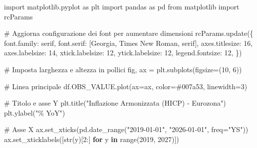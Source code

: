 \documentclass[
  11pt,
]{article}
\newenvironment{Shaded}{\begin{snugshade}}{\end{snugshade}}
\newcommand{\BuiltInTok}[1]{\textcolor[rgb]{0.00,0.23,0.31}{#1}}
\newcommand{\CommentTok}[1]{\textcolor[rgb]{0.37,0.37,0.37}{#1}}
\newcommand{\ControlFlowTok}[1]{\textcolor[rgb]{0.00,0.23,0.31}{\textbf{#1}}}
\newcommand{\DecValTok}[1]{\textcolor[rgb]{0.68,0.00,0.00}{#1}}
\newcommand{\ImportTok}[1]{\textcolor[rgb]{0.00,0.46,0.62}{#1}}
\newcommand{\KeywordTok}[1]{\textcolor[rgb]{0.00,0.23,0.31}{\textbf{#1}}}
\newcommand{\NormalTok}[1]{\textcolor[rgb]{0.00,0.23,0.31}{#1}}
\newcommand{\OperatorTok}[1]{\textcolor[rgb]{0.37,0.37,0.37}{#1}}
\newcommand{\StringTok}[1]{\textcolor[rgb]{0.13,0.47,0.30}{#1}}
\begin{document}
\begin{Shaded}
\begin{Highlighting}[]
\ImportTok{import}\NormalTok{ matplotlib.pyplot }\ImportTok{as}\NormalTok{ plt}
\ImportTok{import}\NormalTok{ pandas }\ImportTok{as}\NormalTok{ pd}
\ImportTok{from}\NormalTok{ matplotlib }\ImportTok{import}\NormalTok{ rcParams}

\CommentTok{\# Aggiorna configurazione dei font per aumentare dimensioni}
\NormalTok{rcParams.update(\{}
    \StringTok{\textquotesingle{}font.family\textquotesingle{}}\NormalTok{: }\StringTok{\textquotesingle{}serif\textquotesingle{}}\NormalTok{,}
    \StringTok{\textquotesingle{}font.serif\textquotesingle{}}\NormalTok{: [}\StringTok{\textquotesingle{}Georgia\textquotesingle{}}\NormalTok{, }\StringTok{\textquotesingle{}Times New Roman\textquotesingle{}}\NormalTok{, }\StringTok{\textquotesingle{}serif\textquotesingle{}}\NormalTok{],}
    \StringTok{\textquotesingle{}axes.titlesize\textquotesingle{}}\NormalTok{: }\DecValTok{16}\NormalTok{,}
    \StringTok{\textquotesingle{}axes.labelsize\textquotesingle{}}\NormalTok{: }\DecValTok{14}\NormalTok{,}
    \StringTok{\textquotesingle{}xtick.labelsize\textquotesingle{}}\NormalTok{: }\DecValTok{12}\NormalTok{,}
    \StringTok{\textquotesingle{}ytick.labelsize\textquotesingle{}}\NormalTok{: }\DecValTok{12}\NormalTok{,}
    \StringTok{\textquotesingle{}legend.fontsize\textquotesingle{}}\NormalTok{: }\DecValTok{12}\NormalTok{,}
\NormalTok{\})}

\CommentTok{\# Imposta larghezza e altezza in pollici}
\NormalTok{fig, ax }\OperatorTok{=}\NormalTok{ plt.subplots(figsize}\OperatorTok{=}\NormalTok{(}\DecValTok{10}\NormalTok{, }\DecValTok{6}\NormalTok{))}

\CommentTok{\# Linea principale}
\NormalTok{df.OBS\_VALUE.plot(ax}\OperatorTok{=}\NormalTok{ax, color}\OperatorTok{=}\StringTok{\textquotesingle{}\#007a53\textquotesingle{}}\NormalTok{, linewidth}\OperatorTok{=}\DecValTok{3}\NormalTok{)}

\CommentTok{\# Titolo e asse Y}
\NormalTok{plt.title(}\StringTok{"Inflazione Armonizzata (HICP) {-} Eurozona"}\NormalTok{)}
\NormalTok{plt.ylabel(}\StringTok{"\% YoY"}\NormalTok{)}

\CommentTok{\# Asse X}
\NormalTok{ax.set\_xticks(pd.date\_range(}\StringTok{"2019{-}01{-}01"}\NormalTok{, }\StringTok{"2026{-}01{-}01"}\NormalTok{, freq}\OperatorTok{=}\StringTok{"YS"}\NormalTok{))}
\NormalTok{ax.set\_xticklabels([}\BuiltInTok{str}\NormalTok{(y)[}\DecValTok{2}\NormalTok{:] }\ControlFlowTok{for}\NormalTok{ y }\KeywordTok{in} \BuiltInTok{range}\NormalTok{(}\DecValTok{2019}\NormalTok{, }\DecValTok{2027}\NormalTok{)])}


\end{Highlighting}
\end{Shaded}
\end{document}
